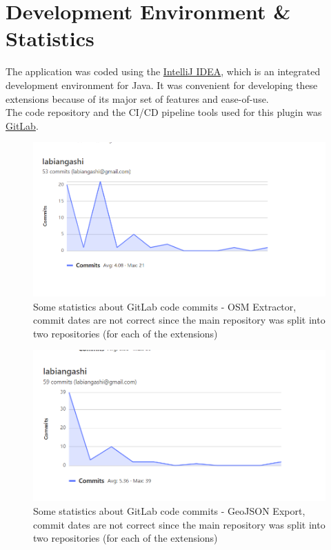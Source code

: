 \chapter{Development Environment \& Statistics}
The application was coded using the \href{https://www.jetbrains.com/idea/}{IntelliJ IDEA}, which is an integrated development environment for Java.
It was convenient for developing these extensions because of its major set of features and ease-of-use.\\
\newline
The code repository and the CI/CD pipeline tools used for this plugin was \href{https://gitlab.com/}{GitLab}.
\begin{figure}[H]
    \includegraphics[width=\linewidth]{./Figures/Appendices/gitlab_commit_stats_osm_extractor}
    \caption{Some statistics about GitLab code commits - OSM Extractor, commit dates are not correct since the main
    repository was split into two repositories (for each of the extensions) }
\end{figure}
\begin{figure}[H]
    \includegraphics[width=\linewidth]{./Figures/Appendices/gitlab_commit_stats_geojson_export}
    \caption{Some statistics about GitLab code commits - GeoJSON Export, commit dates are not correct since the main
    repository was split into two repositories (for each of the extensions) }
\end{figure}
